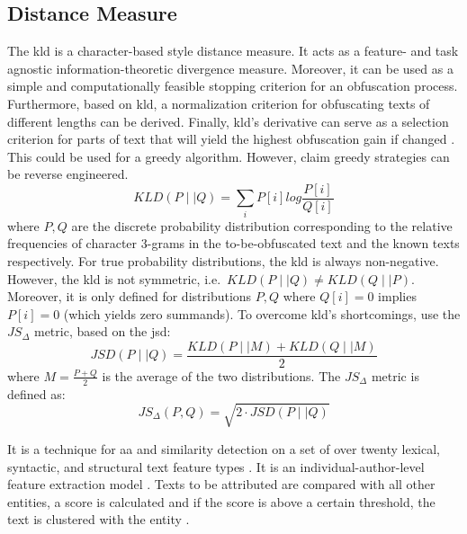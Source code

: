 \subsection{Distance Measure}
The \ac{kld} is a character-based style distance measure.
It acts as a feature- and task agnostic %
information-theoretic divergence measure.
Moreover, it can be used as a simple and computationally feasible stopping criterion for an obfuscation process.
Furthermore, based on \ac{kld}, a normalization criterion for obfuscating texts of different lengths can be derived.
Finally, \ac{kld}'s derivative can serve as a selection criterion for parts of text that 
will yield the highest obfuscation gain if changed \citep{bevendorff_divergence_based_2020}.
This could be used for a greedy algorithm.
However, \citet{bevendorff_divergence_based_2020} claim greedy strategies can be reverse engineered.
$$KLD(P\mid \mid Q) = \sum_{i}^{}P[i] log\frac{P[i]}{Q[i]}$$
where $P,Q$ are the discrete probability distribution corresponding to the relative frequencies of character 3-grams in the 
to-be-obfuscated text and the known texts respectively.
For true probability distributions, the \ac{kld} is always non-negative.
However, the \ac{kld} is not symmetric, i.e.\ $KLD(P\mid \mid Q) \neq KLD(Q\mid \mid P)$.
Moreover, it is only defined for distributions $P,Q$ where $Q[i] = 0$ implies $P[i] = 0$ (which yields zero summands).
To overcome \ac{kld}'s shortcomings, 
\citet{bevendorff_divergence_based_2020} use the $JS_\Delta$ metric, based on the \ac{jsd}:
$$JSD(P\mid \mid Q) = \frac{KLD(P\mid \mid M)+KLD(Q\mid \mid M)}{2}$$
where $M = \frac{P + Q}{2}$ is the average of the two distributions.
The $JS_\Delta$ metric is defined as:
$$JS_\Delta(P,Q) = \sqrt{2\cdot JSD(P\mid \mid Q)}$$

\begin{definition}
    [Writeprints]
    \label{def:writeprints}
    It is a technique for \ac{aa} and similarity detection \citep{elmanarelbouanani_authorship_2014,neal_surveying_2018} 
    on a set of over twenty lexical, syntactic, and structural text feature types \citep{bevendorff_divergence_based_2020}.
    It is an individual-author-level feature extraction model \citep{neal_surveying_2018}.
    Texts to be attributed are compared with all other entities, a score is calculated and if the score is above a certain threshold, 
    the text is clustered with the entity \citep{elmanarelbouanani_authorship_2014}.
\end{definition}

